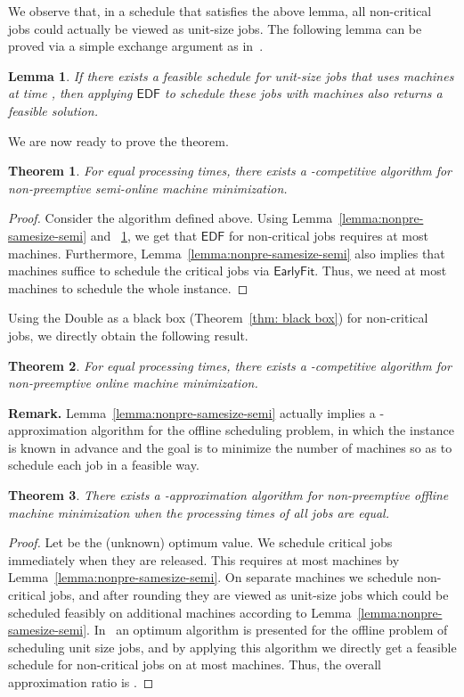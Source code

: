 \documentclass[letterpaper,11pt]{article}
\newtheorem{theorem}{Theorem}
\newtheorem{lemma}{Lemma}
\newcommand{\EDF}{\ensuremath{\mathsf{EDF}}\xspace}
\newcommand{\Earlyfit}{\ensuremath{\mathsf{EarlyFit}}\xspace}
\newcommand{\double}{{\sf Double}\xspace}
\begin{document}
We observe that, in a schedule that satisfies the above lemma, all non-critical jobs could actually be viewed as unit-size jobs. The following lemma can be proved via a simple exchange argument as in~\cite{KaoCRW12}.

\begin{lemma}\label{lem:unit-non-critical}
If there exists a feasible schedule for unit-size jobs that uses  machines at time , then applying \EDF to schedule these jobs with  machines also returns a feasible solution.
\end{lemma} 

We are now ready to prove the theorem.

\begin{theorem}
For equal processing times, there exists a -competitive algorithm for non-preemptive semi-online machine minimization.
\end{theorem}
\begin{proof}
	Consider the algorithm defined above. Using Lemma~\ref{lemma:nonpre-samesize-semi} and ~\ref{lem:unit-non-critical}, we get that \EDF for non-critical jobs requires at most  machines. Furthermore, Lemma~\ref{lemma:nonpre-samesize-semi} also implies that  machines suffice to schedule the critical jobs via \Earlyfit. Thus, we need at most  machines to schedule the whole instance.
\end{proof}



Using the \double as a black box (Theorem~\ref{thm: black box}) for non-critical jobs, we directly obtain the following result.

\begin{theorem}
  For equal processing times, there exists a -competitive algorithm for non-preemptive online machine minimization.
\end{theorem} 

\noindent\textbf{Remark.} Lemma~\ref{lemma:nonpre-samesize-semi} actually implies a -approximation algorithm for the offline scheduling problem, in which the instance is known in advance and the goal is to minimize the number of machines so as to schedule each job in a feasible way. 
\begin{theorem}\label{coro:offline}
There exists a -approximation algorithm for non-preemptive offline machine minimization when the processing times of all jobs are equal.
\end{theorem}
\begin{proof}
Let  be the (unknown) optimum value. We schedule critical jobs immediately when they are released. This requires at most  machines by Lemma~\ref{lemma:nonpre-samesize-semi}. On separate machines we schedule non-critical jobs, and after rounding they are viewed as unit-size jobs which could be scheduled feasibly on additional  machines according to Lemma~\ref{lemma:nonpre-samesize-semi}. In~\cite{KaoCRW12} an optimum algorithm is presented for the offline problem of scheduling unit size jobs, and by applying this algorithm we directly get a feasible schedule for non-critical jobs on at most  machines. Thus, the overall approximation ratio is . 
\end{proof}
  
\end{document}
